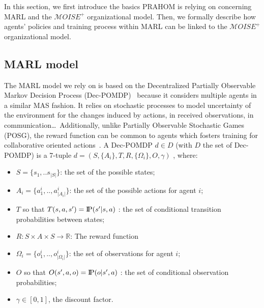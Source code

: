 \documentclass{ecai}
\newcommand{\probP}{\text{I\kern-0.15em P}}
\begin{document}




In this section, we first introduce the basics PRAHOM is relying on concerning MARL and the $\mathcal{M}OISE^{+}$ organizational model. Then, we formally describe how agents' policies and training process within MARL can be linked to the $\mathcal{M}OISE^{+}$ organizational model.

\subsection{MARL model}

The MARL model we rely on is based on the Decentralized Partially Observable Markov Decision Process (Dec-POMDP)~\citep{Oliehoek2016} because it considers multiple agents in a similar MAS fashion. It relies on stochastic processes to model uncertainty of the environment for the changes induced by actions, in received observations, in communication\dots \ Additionally, unlike Partially Observable Stochastic Games (POSG), the reward function can be common to agents which fosters training for collaborative oriented actions~\citep{Beynier2013}.
A Dec-POMDP $d \in D$ (with $D$ the set of Dec-POMDP) is a 7-tuple $d = (S,\{A_i\},T,R,\{\Omega_i\},O,\gamma)$ , where:
\begin{itemize}
    \item $S = \{s_1, ..s_{|S|}\}$: the set of the possible states;
    \item $A_{i} = \{a_{1}^{i},..,a_{|A_{i}|}^{i}\}$: the set of the possible actions for agent $i$;
    \item $T$ so that $T(s,a,s') = \probP{(s'|s,a)}$ : the set of conditional transition probabilities between states;
    \item $R: S \times A \times S \rightarrow \mathbb{R}$: The reward function
    \item $\Omega_{i} = \{o_{1}^{i},..,o_{|\Omega_{i}|}^{i}\}$: the set of observations for agent $i$;
    \item $O$ so that $O(s',a,o) = \probP{(o|s',a)}$ : the set of conditional observation probabilities;
    \item $\gamma \in [0,1]$, the discount factor.
\end{itemize}
\end{document}
